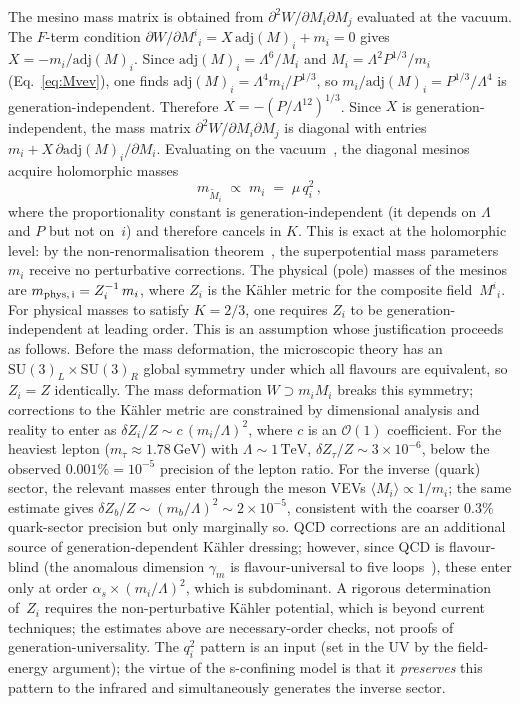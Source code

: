 \documentclass[preprint,12pt]{elsarticle}
\newcommand{\SU}{\mathrm{SU}}
\newcommand{\adj}{\mathrm{adj}}
\newcommand{\GeV}{\,\mathrm{GeV}}
\newcommand{\TeV}{\,\mathrm{TeV}}
\begin{document}
The mesino mass matrix is obtained from
$\partial^2 W / \partial M_i \partial M_j$
evaluated at the vacuum.
The $F$-term condition
$\partial W/\partial M^i{}_i = X\,\adj(M)_i + m_i = 0$
gives $X = -m_i/\adj(M)_i$.
Since $\adj(M)_i = \Lambda^6/M_i$ and
$M_i = \Lambda^2 P^{1/3}/m_i$ (Eq.~\ref{eq:Mvev}),
one finds $\adj(M)_i = \Lambda^4 m_i/P^{1/3}$,
so $m_i/\adj(M)_i = P^{1/3}/\Lambda^4$
is generation-independent.
Therefore $X = -(P/\Lambda^{12})^{1/3}$.
Since $X$ is generation-independent,
the mass matrix
$\partial^2 W/\partial M_i\partial M_j$
is diagonal with entries
$m_i + X\,\partial\adj(M)_i/\partial M_i$.
Evaluating on the vacuum~\cite{Csaki:1996zb},
the diagonal mesinos acquire holomorphic masses
\begin{equation}
  m_{\tilde{M}_i} \;\propto\; m_i \;=\; \mu\,q_i^2\,,
  \label{eq:mesino_mass}
\end{equation}
where the proportionality constant is
generation-independent (it depends on $\Lambda$
and $P$ but not on~$i$) and therefore cancels
in $K$.
This is exact at the holomorphic level: by the
non-renormalisation theorem~\cite{Seiberg:1993vc},
the superpotential mass parameters $m_i$ receive no
perturbative corrections.
The physical (pole) masses of the mesinos are
$m_{\rm phys,\,i} = Z_i^{-1}\,m_i$,
where $Z_i$ is the K\"ahler metric for the
composite field~$M^i{}_i$.
For physical masses to satisfy $K = 2/3$,
one requires $Z_i$ to be generation-independent
at leading order.
This is an assumption whose justification
proceeds as follows.
Before the mass deformation, the microscopic theory
has an $\SU(3)_L \times \SU(3)_R$ global symmetry
under which all flavours are equivalent, so
$Z_i = Z$ identically.
The mass deformation $W \supset m_i M_i$ breaks this
symmetry; corrections to the K\"ahler metric are
constrained by dimensional analysis and reality to
enter as $\delta Z_i/Z \sim c\,(m_i/\Lambda)^2$,
where $c$ is an $\mathcal{O}(1)$ coefficient.
For the heaviest lepton ($m_\tau \approx 1.78\GeV$)
with $\Lambda \sim 1\TeV$,
$\delta Z_\tau/Z \sim 3 \times 10^{-6}$,
below the observed $0.001\% = 10^{-5}$ precision
of the lepton ratio.
For the inverse (quark) sector, the relevant
masses enter through the meson VEVs
$\langle M_i \rangle \propto 1/m_i$;
the same estimate gives
$\delta Z_b/Z \sim (m_b/\Lambda)^2 \sim 2 \times 10^{-5}$,
consistent with the coarser $0.3\%$ quark-sector
precision but only marginally so.
QCD corrections are an additional source of
generation-dependent K\"ahler dressing;
however, since QCD is flavour-blind
(the anomalous dimension $\gamma_m$ is
flavour-universal to five loops~\cite{Martin:2019}),
these enter only at order
$\alpha_s \times (m_i/\Lambda)^2$, which is subdominant.
A rigorous determination of~$Z_i$ requires the
non-perturbative K\"ahler potential,
which is beyond current techniques;
the estimates above are necessary-order checks,
not proofs of generation-universality.
The $q_i^2$ pattern is an input (set in the UV by the
field-energy argument); the virtue of the s-confining
model is that it \emph{preserves} this pattern to
the infrared and simultaneously generates the
inverse sector.
\end{document}
